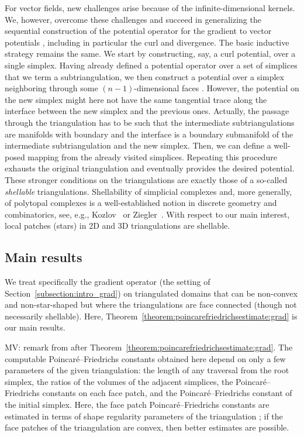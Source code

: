 \documentclass[10pt,a4paper]{article}
\newcommand\cye[1]{%
\protect\leavevmode
\begingroup
    \color{blue}%
    #1%
\endgroup
}
\newcommand{\mwl}[1]{{\color{red}#1}}
\begin{document}
For vector fields, new challenges arise \cye{because of} the infinite-dimensional kernels. We, \cye{however, overcome these challenges and succeed in generalizing} the sequential construction of the potential operator for the gradient to vector potentials\cye{, including in particular} the curl and divergence. The basic inductive strategy remains the same. We start by constructing, say, a curl potential, over a single simplex. Having already defined a potential operator over a \cye{set of simplices that we term} a subtriangulation, we then construct a potential over a simplex \cye{neighboring through some $(n-1)$-dimensional faces}. However, the potential \cye{on the new simplex} might \cye{here} not have the same tangential trace along the interface between the new simplex and the previous ones. Actually, the passage through the triangulation has to be such that the intermediate subtriangulations are manifolds with boundary and the interface is a boundary submanifold of the intermediate subtriangulation and the new simplex. 
Then, we can define a well-posed \cye{mapping from the already visited simplices.} Repeating this procedure exhausts the original triangulation and eventually provides the desired potential.
These stronger conditions on the triangulations are exactly those of a so-called \emph{shellable} triangulations. Shellability of simplicial complexes and, more generally, of polytopal complexes is a well-established notion in discrete geometry and combinatorics, see, e.g., Kozlov~\cite{kozlov2008combinatorial} or Ziegler~\cite{ziegler1995lectures}.
With respect to our main interest, local \cye{patches} (stars) in 2D and 3D triangulations are shellable. 



\subsection{Main results}

\cye{We treat specifically the gradient operator (the setting of Section~\ref{subsection:intro_grad}) on triangulated domains that can be non-convex and non-star-shaped but where the triangulations are face connected (though not necessarily shellable). Here, Theorem~\ref{theorem:poincarefriedrichsestimate:grad} is our main results.} 
\mwl{MV: remark from after Theorem~\ref{theorem:poincarefriedrichsestimate:grad}.} 
The computable Poincar\'e--Friedrichs constants obtained here depend on only a few parameters of the \cye{given} triangulation: the length of any traversal from the root simplex, the ratios of the volumes of \cye{the} adjacent simplices, the Poincar\'e--Friedrichs constants on each face patch, and the Poincar\'e--Friedrichs constant of the initial simplex. \cye{Here,} the \cye{face patch} Poincar\'e--Friedrichs constants \cye{are} estimated in terms of shape \cye{regularity parameters of the triangulation}; if the face patches of the triangulation are convex, then better estimates are possible. 
\end{document}
